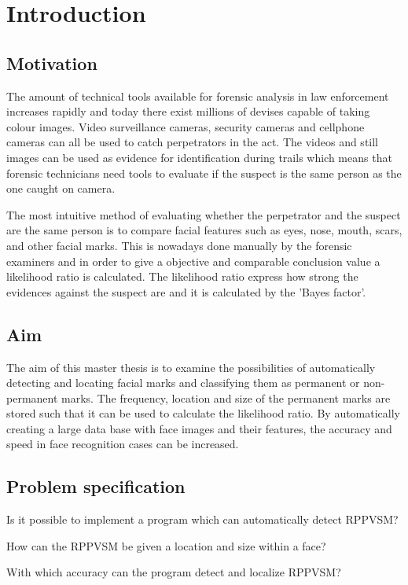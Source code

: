 \section{Introduction}
\subsection{Motivation}
The amount of technical tools available for forensic analysis in law enforcement increases rapidly and today there exist millions of devises capable of taking colour images. Video surveillance cameras, security cameras and cellphone cameras can all be used to catch perpetrators in the act. The videos and still images can be used as evidence for identification during trails which means that forensic technicians need tools to evaluate if the suspect is the same person as the one caught on camera.

The most intuitive method of evaluating whether the perpetrator and the suspect are the same person is to compare facial features such as eyes, nose, mouth, scars, and other facial marks. This is nowadays done manually \cite{face_soft} by the forensic examiners and in order to give a objective and comparable conclusion value a likelihood ratio \cite{NFC_stat} is calculated. The likelihood ratio express how strong the evidences against the suspect are and it is calculated by the 'Bayes factor'. 

\subsection{Aim}

The aim of this master thesis is to examine the possibilities of automatically detecting and locating facial marks and classifying them as permanent or non-permanent marks. The frequency, location and size of the permanent marks are stored such that it can be used to calculate the likelihood ratio. By automatically creating a large data base with face images and their features, the accuracy and speed in face recognition cases can be increased. 

\subsection{Problem specification}

\begin{displayquote}
	Is it possible to implement a program which can automatically detect RPPVSM?

	How can the RPPVSM be given a location and size within a face?

	With which accuracy can the program detect and localize RPPVSM?
\end{displayquote}




